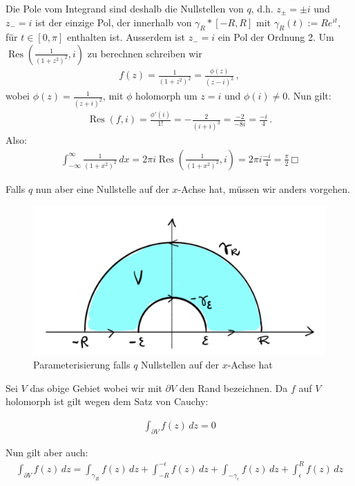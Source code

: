 \documentclass[a4paper,10pt]{article}
\begin{document}
Die Pole vom Integrand sind deshalb die Nullstellen von \(q\), d.h. \(z_{\pm}= \pm i\) und \(z_-= i\) ist der einzige Pol, der innerhalb von \(\gamma_R\ast[-R,R]\) mit \(\gamma_R(t):=Re^{ i t}\), für \(t\in[0,\pi]\) enthalten ist. Ausserdem ist \(z_-= i\) ein Pol der Ordnung 2. Um \(\operatorname{Res} \left(\frac{1}{(1+z^2)^2}, i \right)\) zu berechnen schreiben wir \begin{align*} f(z)=\frac{1}{(1+z^2)^2}=\frac{\phi(z)}{(z- i)^2}\,, \end{align*} wobei \(\phi(z)=\frac{1}{(z+ i)^2}\), mit \(\phi\) holomorph um \(z= i\) und \(\phi( i)\neq0\). Nun gilt: \begin{align*} \operatorname{Res}(f, i) = \frac{\phi'( i)}{1!} = -\frac{2}{( i + i)^3} = \frac{-2}{-8 i} = \frac{- i}{4}\,. \end{align*} Also: \begin{align*} \int_{-\infty}^\infty \frac{1}{(1+x^2)^2}\,dx =2\pi i\operatorname{Res} \left(\frac{1}{(1+x^2)^2}, i \right)= 2\pi i\frac{- i}{4}=\frac{\pi}{2}\,□ \end{align*}

Falls $q$ nun aber eine Nullstelle auf der $x$-Achse hat, müssen wir anders vorgehen.

\begin{figure}[H]
  \centering 
  \includegraphics[width=0.75\linewidth]{assets/4-4-2.png}
  \caption{Parameterisierung falls $q$ Nullstellen auf der $x$-Achse hat}
\end{figure}

Sei $V$ das obige Gebiet wobei wir mit $\partial V$ den Rand bezeichnen. Da $f$ auf $V$ holomorph ist gilt wegen dem Satz von Cauchy:

\begin{align*} \int_{\partial V}f(z)\,dz=0 \end{align*} 

Nun gilt aber auch:
\begin{align*} \int_{\partial V}f(z)\,dz=\int_{\gamma_R} f(z)\,dz+\int_{-R}^{-\epsilon}f(z)\,dz+\int_{-\gamma_\epsilon} f(z)\,dz+\int_\epsilon ^Rf(z)\,dz \end{align*}
\end{document}
